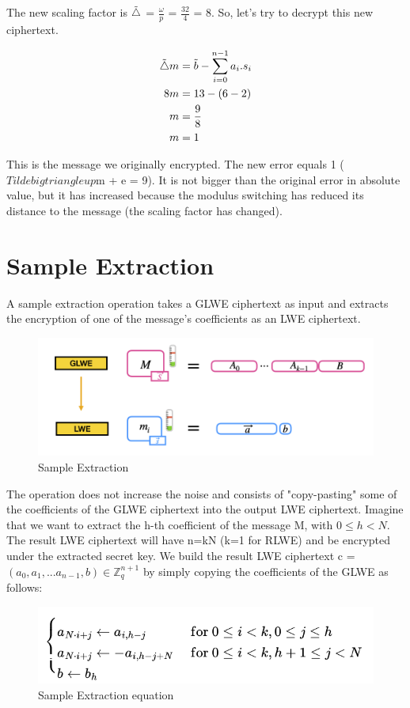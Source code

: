 \documentclass{techrep}
\theoremstyle{definition}
\theoremstyle{plain}
\newcommand{\Z}{\mathbb{Z}}
\begin{document}
The new scaling factor is $\Tilde{\bigtriangleup}$ = $\frac{\omega}{p}$ = $\frac{32}{4}$ = 8. So, let's try to decrypt this new ciphertext.

	\begin{align*}
        \Tilde{\bigtriangleup}m &=	\Tilde{b} -\sum_{i=0}^{n-1}a_i.s_i \\
           8m              &=	13 - (6 -2) \\
           m  &=	\frac{9}{8} \\
           m &= 1
	\end{align*}

This is the message we originally encrypted. The new error equals 1 ($ Tildebigtriangleup$m + e = 9). It is not bigger than the original error in absolute value, but it has increased because the modulus switching has reduced its distance to the message (the scaling factor has changed).

\section{Sample Extraction}
A sample extraction operation takes a GLWE ciphertext as input and extracts the encryption of one of the message's coefficients as an LWE ciphertext.

	\begin{figure}[H]
		\centering
	\includegraphics[width=0.9\columnwidth]{fig/sample-ex.png}
		\caption{Sample Extraction}
		\label{fig:sample-ex}
	\end{figure}
The operation does not increase the noise and consists of "copy-pasting" some of the coefficients of the GLWE ciphertext into the output LWE ciphertext. Imagine that we want to extract the h-th coefficient of the message M, with $0 \leq h < N$. The result LWE ciphertext will have n=kN (k=1 for RLWE) and be encrypted under the extracted secret key. We build the result LWE ciphertext c = $(a_0, a_1,...a_{n-1}, b) \in \Z_q^{n+1}$ by simply copying the coefficients of the GLWE as follows:


	\begin{figure}[H]
		\centering
	\includegraphics[width=0.9\columnwidth]{fig/sample_ext.png}
		\caption{Sample Extraction equation}
		\label{fig:sample_ext}
	\end{figure}
\end{document}
